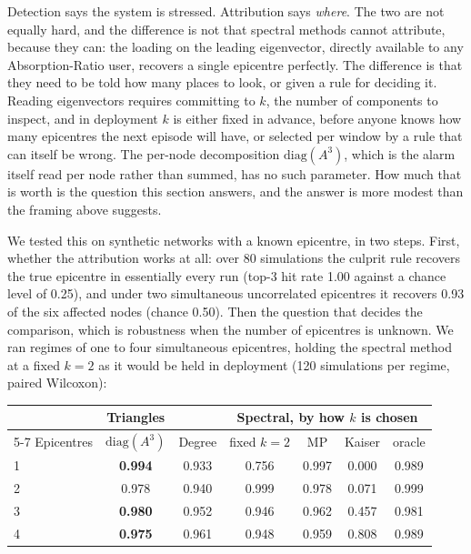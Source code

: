 \documentclass[11pt,a4paper]{article}
\begin{document}
Detection says the system is stressed. Attribution says \emph{where}. The two
are not equally hard, and the difference is not that spectral methods cannot
attribute, because they can: the loading on the leading eigenvector, directly
available to any Absorption-Ratio user, recovers a single epicentre perfectly.
The difference is that they need to be told how many places to look, or given a
rule for deciding it. Reading eigenvectors requires committing to $k$, the
number of components to inspect, and in deployment $k$ is either fixed in
advance, before anyone knows how many epicentres the next episode will have, or
selected per window by a rule that can itself be wrong. The per-node
decomposition $\mathrm{diag}(A^3)$, which is the alarm itself read per node
rather than summed, has no such parameter. How much that is worth is the
question this section answers, and the answer is more modest than the framing
above suggests.

We tested this on synthetic networks with a known epicentre, in two steps.
First, whether the attribution works at all: over 80 simulations the culprit
rule recovers the true epicentre in essentially every run (top-3 hit rate 1.00
against a chance level of 0.25), and under two simultaneous uncorrelated
epicentres it recovers 0.93 of the six affected nodes (chance 0.50). Then the
question that decides the comparison, which is robustness when the number of
epicentres is unknown. We ran regimes of one to four simultaneous epicentres,
holding the spectral method at a fixed $k=2$ as it would be held in deployment
(120 simulations per regime, paired Wilcoxon):

\begin{center}
\begin{tabular}{lcccccc}
\toprule
 & Triangles & & \multicolumn{4}{c}{Spectral, by how $k$ is chosen} \\
\cmidrule(lr){5-7}
Epicentres & $\mathrm{diag}(A^3)$ & Degree & fixed $k=2$ & MP & Kaiser & oracle \\
\midrule
1 & \textbf{0.994} & 0.933 & 0.756 & 0.997 & 0.000 & 0.989 \\
2 & 0.978 & 0.940 & 0.999 & 0.978 & 0.071 & 0.999 \\
3 & \textbf{0.980} & 0.952 & 0.946 & 0.962 & 0.457 & 0.981 \\
4 & \textbf{0.975} & 0.961 & 0.948 & 0.959 & 0.808 & 0.989 \\
\bottomrule
\end{tabular}
\end{center}
\end{document}
